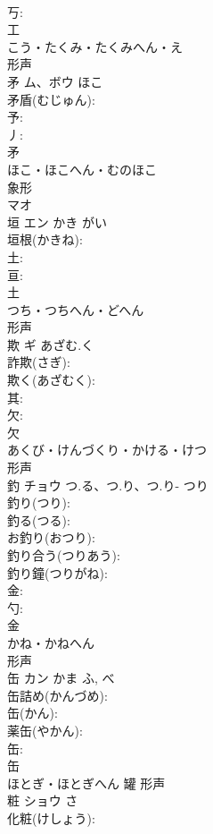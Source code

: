 \documentclass[8pt]{extreport}
\begin{document}
\begin{CJK}{UTF8}{min}
\\	丂: 
\\	工	
\\	こう・たくみ・たくみへん・え	
\\	形声 
\\	矛	ム、ボウ	ほこ		
\\	矛盾(むじゅん): 
\\	予: 
\\	丿: 
\\	矛	
\\	ほこ・ほこへん・むのほこ	
\\	象形 
\\	マオ 
\\	垣	エン	かき	がい	
\\	垣根(かきね): 
\\	土: 
\\	亘: 
\\	土	
\\	つち・つちへん・どへん	
\\	形声 
\\	欺	ギ	あざむ.く		
\\	詐欺(さぎ): 
\\	欺く(あざむく): 
\\	其: 
\\	欠: 
\\	欠	
\\	あくび・けんづくり・かける・けつ	
\\	形声 
\\	釣	チョウ	つ.る、つ.り、つ.り-	つり	
\\	釣り(つり): 
\\	釣る(つる): 
\\	お釣り(おつり): 
\\	釣り合う(つりあう): 
\\	釣り鐘(つりがね): 
\\	金: 
\\	勺: 
\\	金	
\\	かね・かねへん	
\\	形声 
\\	缶	カン	かま	ふ, べ	
\\	缶詰め(かんづめ): 
\\	缶(かん): 
\\	薬缶(やかん): 
\\	缶: 
\\	缶	
\\	ほとぎ・ほとぎへん	罐	形声 
\\	粧	ショウ		さ	
\\	化粧(けしょう): 

\end{CJK}
\end{document}
